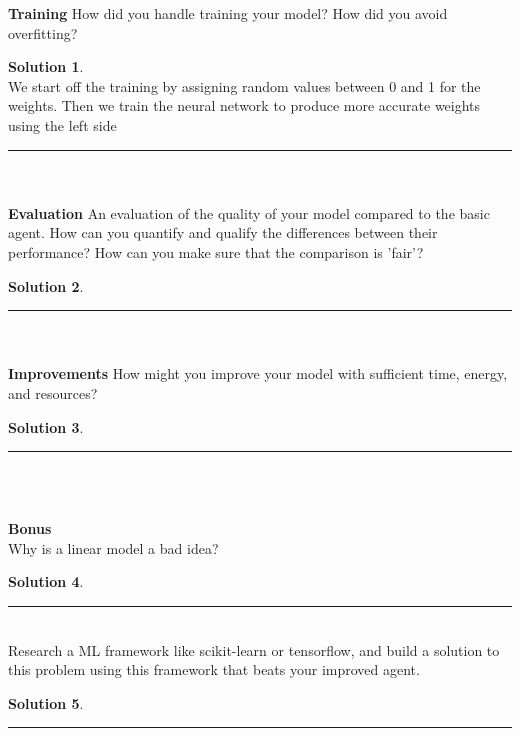 \documentclass{article}
\theoremstyle{definition}
\def\fline{\rule{0.75\linewidth}{0.5pt}}
\newcommand{\finishline}{\vspace{-15pt}\begin{center}\fline\end{center}}
\newtheorem*{solution*}{Solution}
\newenvironment{solution}{\begin{solution*}}{{\finishline} \end{solution*}}
\begin{document}
    \textbf{Training}
        How did you handle training your model? How did you avoid overfitting? 
        \begin{solution} \hfill \\
        We start off the training by assigning random values between 0 and 1 for the weights. Then we train the neural network to produce more accurate weights using the left side
        \end{solution}\\\\
        
    \textbf{Evaluation}
        An evaluation of the quality of your model compared to the basic agent. How can you quantify and qualify the differences between their performance? How can you make sure that the comparison is 'fair'? 
        \begin{solution} \hfill \\
    
        \end{solution}\\\\
        
    \textbf{Improvements}
        How might you improve your model with sufficient time, energy, and resources?
        \begin{solution} \hfill \\
    
        \end{solution}\\\\
\smallskip

\textbf{\Large Bonus} \\
    Why is a linear model a bad idea? 
    \begin{solution} \hfill \\
    
    \end{solution}\\
    
    Research a ML framework like scikit-learn or tensorflow, and build a solution to this problem using this framework that beats your improved agent.
    \begin{solution} \hfill \\
    
    \end{solution}\\

\smallskip   
\end{document}
